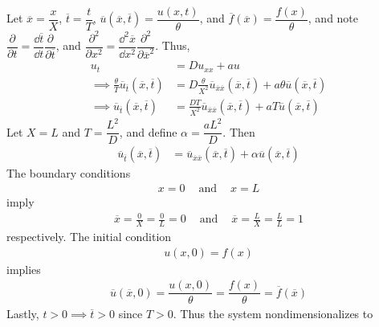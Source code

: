\documentclass[paper=a4, fontsize=11pt]{scrartcl} %
\theoremstyle{plain}
\numberwithin{equation}{section} %
\numberwithin{figure}{section} %
\numberwithin{table}{section} %
\begin{document}
\begin{enumerate}[\bf (a)]
        Let $\overline{x} = \dfrac{x}{X}$, $\overline{t} = \dfrac{t}{T}$, $\overline{u}(\overline{x}, \overline{t}) = \dfrac{u(x,t)}{\theta}$, and $\overline{f}(\overline{x}) = \dfrac{f(x)}{\theta}$, and note $\dfrac{\partial}{\partial t} = \dfrac{\dd \overline{t}}{\dd t} \dfrac{\partial}{\partial\overline{t}}$, and $\dfrac{\partial^2}{\partial x^2} = \dfrac{\dd^2 \overline{x}}{\dd x^2} \dfrac{\partial^2}{\partial\overline{x}^2}$.  Thus,
        \begin{align*}
            u_t &= Du_{xx} + au \\
            \implies \frac{\theta}{T}\overline{u}_{\overline{t}}(\overline{x}, \overline{t}) &= D\frac{\theta}{X^2}\overline{u}_{\overline{x}\overline{x}}(\overline{x}, \overline{t}) + a\theta\overline{u}(\overline{x}, \overline{t}) \\
            \implies \overline{u}_{\overline{t}}(\overline{x}, \overline{t}) &= \frac{DT}{X^2}\overline{u}_{\overline{x}\overline{x}}(\overline{x}, \overline{t}) + aT\overline{u}(\overline{x}, \overline{t})
        \end{align*}
        Let $X = L$ and $T = \dfrac{L^2}{D}$, and define $\alpha = \dfrac{aL^2}{D}$.  Then
        \begin{align*}
            \overline{u}_{\overline{t}}(\overline{x}, \overline{t}) &= \overline{u}_{\overline{x}\overline{x}}(\overline{x}, \overline{t}) + \alpha\overline{u}(\overline{x}, \overline{t})
        \end{align*}
        The boundary conditions
        \begin{align*}
            x = 0\ \ \ \ \text{ and }\ \ \ \ x = L
        \end{align*} imply
        \begin{align*}
            \overline{x} = \frac{0}{X} = \frac{0}{L} = 0\ \ \ \ \text{ and }\ \ \ \ \overline{x} = \frac{L}{X} = \frac{L}{L} = 1
        \end{align*}
        respectively.  The initial condition
        \begin{align*}
            u(x,0) = f(x)
        \end{align*}
        implies
        \begin{align*}
            \overline{u}(\overline{x}, 0) = \dfrac{u(x,0)}{\theta} = \dfrac{f(x)}{\theta} = \overline{f}(\overline{x})
        \end{align*}
        Lastly, $t > 0 \implies \overline{t} > 0$ since $T > 0$.  Thus the system nondimensionalizes to
        \begin{align*}

\end{align*}
\end{enumerate}
\end{document}
